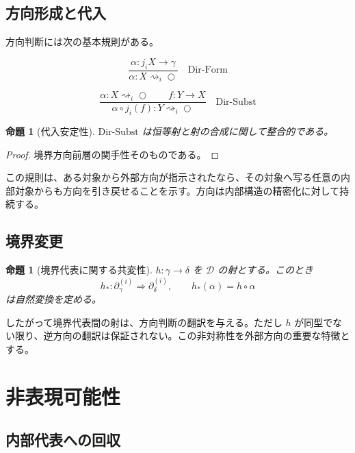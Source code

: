 \documentclass[a4paper,11pt]{ltjsarticle}
\theoremstyle{definition}
\theoremstyle{plain}
\newtheorem{proposition}[definition]{命題}
\newcommand{\dfix}{\bigcirc}
\begin{document}
\subsection{方向形成と代入}

方向判断には次の基本規則がある。

\begin{equation}
 \frac{\alpha:j_iX\to\gamma}
      {\alpha:X\rightsquigarrow_i\dfix}
 \quad\mathrm{Dir\mbox{-}Form}
 \label{rule:dir-form}
\end{equation}

\begin{equation}
 \frac{\alpha:X\rightsquigarrow_i\dfix
       \qquad f:Y\to X}
      {\alpha\circ j_i(f):Y\rightsquigarrow_i\dfix}
 \quad\mathrm{Dir\mbox{-}Subst}
 \label{rule:dir-subst}
\end{equation}

\begin{proposition}[代入安定性]
$\mathrm{Dir\mbox{-}Subst}$ は恒等射と射の合成に関して整合的である。
\end{proposition}

\begin{proof}
境界方向前層の関手性そのものである。
\end{proof}

この規則は、ある対象から外部方向が指示されたなら、その対象へ写る任意の内部対象からも方向を引き戻せることを示す。方向は内部構造の精密化に対して持続する。

\subsection{境界変更}

\begin{proposition}[境界代表に関する共変性]
$h:\gamma\to\delta$ を $\mathcal D$ の射とする。このとき
\[
 h_*:\partial_\gamma^{(i)}\Longrightarrow
      \partial_\delta^{(i)},
 \qquad
 h_*(\alpha)=h\circ\alpha
\]
は自然変換を定める。
\end{proposition}

したがって境界代表間の射は、方向判断の翻訳を与える。ただし $h$ が同型でない限り、逆方向の翻訳は保証されない。この非対称性を外部方向の重要な特徴とする。

\section{非表現可能性}

\subsection{内部代表への回収}
\end{document}
